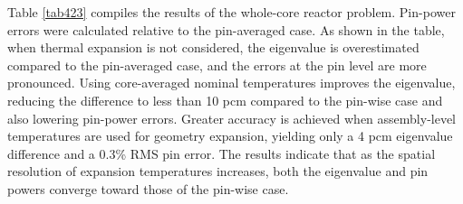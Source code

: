Table \ref{tab423} compiles the results of the whole-core reactor problem. Pin-power errors were calculated relative to the pin-averaged case. As shown in the table, when thermal expansion is not considered, the eigenvalue is overestimated compared to the pin-averaged case, and the errors at the pin level are more pronounced. Using core-averaged nominal temperatures improves the eigenvalue, reducing the difference to less than 10 pcm compared to the pin-wise case and also lowering pin-power errors. Greater accuracy is achieved when assembly-level temperatures are used for geometry expansion, yielding only a 4 pcm eigenvalue difference and a 0.3\% RMS pin error. The results indicate that as the spatial resolution of expansion temperatures increases, both the eigenvalue and pin powers converge toward those of the pin-wise case.


